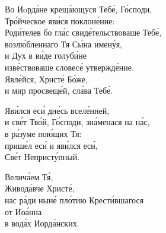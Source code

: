 \documentclass{article}
\begin{document}
%
Во Иoрда́не креща́ющуся Тебе́, Го́споди,\\
Тро́йческое яви́ся поклоне́ние: \\
Роди́телев бо гла́с свиде́тельствоваше Тебе́,\\
возлю́бленнаго Тя Сы́на имену́я,\\
и Дух в ви́де голуби́не\\
изве́ствоваше словесе́ утвержде́ние.\\
Явле́йся, Христе́ Бо́же,\\
и мир просвеще́й, сла́ва Тебе́.

Яви́лся еси́ дне́сь вселе́нней,\\
и све́т Тво́й, Го́споди, зна́менася на на́с,\\
в ра́зуме пою́щих Тя:\\
прише́л еси́ и яви́лся еси́,\\
Све́т Непристу́пный.

Велича́ем Тя́,\\
Живода́вче Христе́,\\
нас ра́ди ныне́ пло́тию Крести́вшагося\\
от Иоа́нна\\
в вода́х Иорда́нских.
\end{document}
